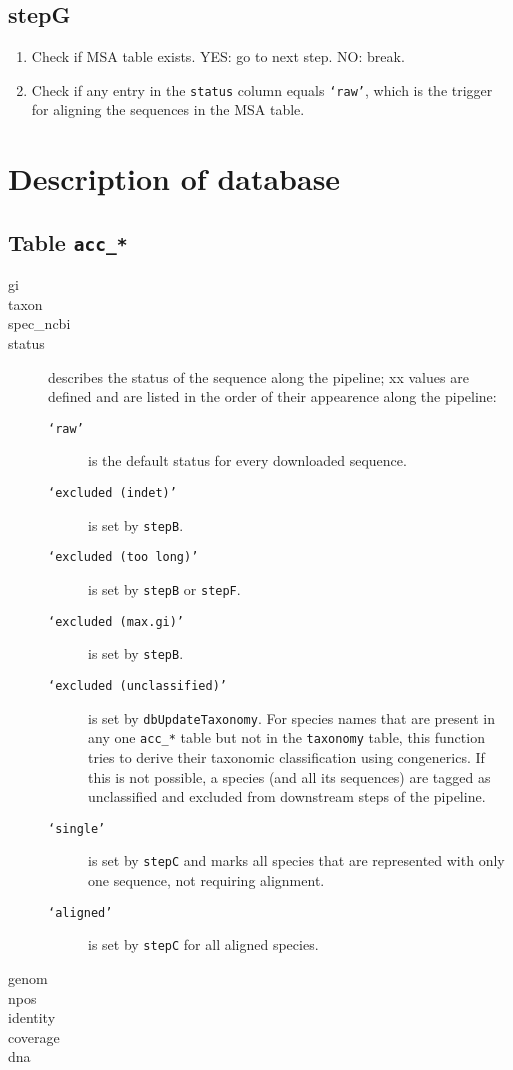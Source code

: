 \documentclass[12pt]{article}
\begin{document}
\subsection{stepG}

\begin{enumerate}
\item Check if MSA table exists. YES: go to next step. NO: break.
\item Check if any entry in the \texttt{status} column equals \texttt{`raw'}, which is the trigger for aligning the sequences in the MSA table. 
\end{enumerate}

\section{Description of database}

\subsection{Table \texttt{acc\_*}}

\begin{description}
\item[gi] 
\item[taxon] 
\item[spec\_ncbi] 
\item[status] describes the status of the sequence along the pipeline; xx values are defined and are listed in the order of their appearence along the pipeline:
	\begin{description}
	\item[\texttt{`raw'}] is the default status for every downloaded sequence.
	\item[\texttt{`excluded (indet)'}] is set by \texttt{stepB}.
	\item[\texttt{`excluded (too long)'}] is set by \texttt{stepB} or \texttt{stepF}.
	\item[\texttt{`excluded (max.gi)'}] is set by \texttt{stepB}.
	\item[\texttt{`excluded (unclassified)'}]  is set by \texttt{dbUpdateTaxonomy}. For species names that are present in any one \texttt{acc\_*} table but not in the \texttt{taxonomy} table, this function tries to derive their taxonomic classification using congenerics. If this is not possible, a species (and all its sequences) are tagged as unclassified and excluded from downstream steps of the pipeline.
	\item[\texttt{`single'}] is set by \texttt{stepC} and marks all species that are represented with only one sequence, not requiring alignment.
	\item[\texttt{`aligned'}] is set by \texttt{stepC} for all aligned species.
	\end{description}

\item[genom] 
\item[npos] 
\item[identity] 
\item[coverage] 
\item[dna]
\end{description}
\end{document}
